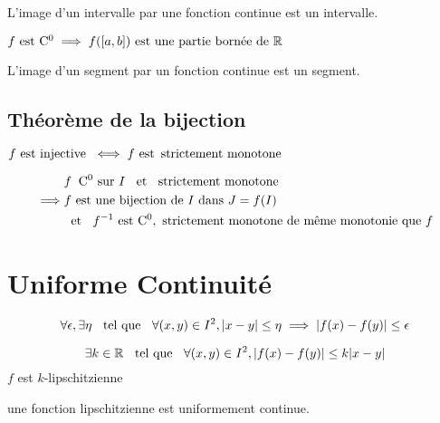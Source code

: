 \begin{cor}
L'image d'un intervalle par une fonction continue est un intervalle.
\end{cor}

\begin{thm}
$f \text{ est } \mathrm{C^{0}} \implies f({[a, b]}) \text{ est une partie bornée de } \mathbb{R}$
\end{thm}

\begin{thm}
L'image d'un segment par un fonction continue est un segment.
\end{thm}

\subsection{Théorème de la bijection}

\begin{prp}
$f \text{ est injective } \iff f \text{ est } \! \text{ strictement monotone }$
\end{prp}

\begin{thm}[de la bijection]
\begin{align*}
            &f \;\; \mathrm{C^{0}} \text{ sur } I \;\;\text{ et }\;\; \!\! \text{ strictement monotone } \\ 
\implies    &f \text{ est une bijection de } I \text{ dans } J = f(I) \\
            &\!\! \;\;\text{ et }\;\; f^{-1} \text{ est } \mathrm{C^{0}}, \text{ strictement monotone } \!\! 
                \text{ de même monotonie que } f
\end{align*}
\end{thm}

\section{Uniforme Continuité}

\begin{dfn}
\[
\forall \epsilon, \exists \eta \;\;\text{ tel que }\;\; \forall (x, y) \in I^2,
|x - y| \leq \eta \implies |f(x) - f(y)| \leq \epsilon
\]
\end{dfn}

\begin{dfn}
\[
    \exists k \in \mathbb{R} \;\;\text{ tel que }\;\; \forall (x, y) \in I^2, |f(x) - f(y)| \leq k|x - y|
\]
$f$ est $k$-lipschitzienne
\end{dfn}

\begin{prp}
une fonction lipschitzienne est uniformement continue.
\end{prp}

